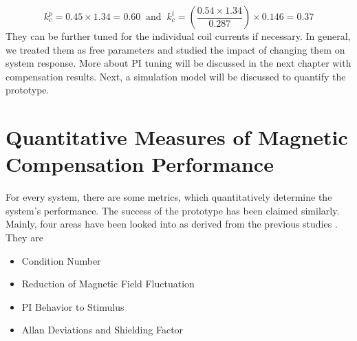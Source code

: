\begin{equation}
    k_c^p=0.45\times1.34=0.60\;\;\text{and}\;\; k_c^i=\left(\frac{0.54 \times1.34}{0.287}\right)\times0.146=0.37
\end{equation}
They can be further tuned for the individual coil currents if necessary. In general, we treated them as free parameters and studied the impact of changing them on system response. More about PI tuning will be discussed in the next chapter with compensation results. Next, a simulation model will be discussed to quantify the prototype.








 
 
% 

\FloatBarrier




\section{Quantitative Measures of Magnetic Compensation Performance\label{sec:metrics}}
For every system, there are some metrics, which quantitatively determine the system's performance. The success of the prototype has been claimed similarly. Mainly, four areas have been looked into as derived from the previous studies \cite{bea,lins,rawlik}. They are

\begin{itemize}
    \item Condition Number
    \item Reduction of Magnetic Field Fluctuation
    \item PI Behavior to Stimulus
    \item Allan Deviations and Shielding Factor

\end{itemize}
